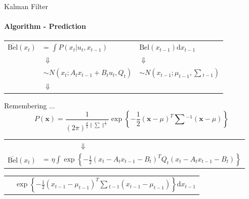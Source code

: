 \documentclass[aspectratio=169]{beamer}
\begin{document}
\begin{frame}[c]{Kalman Filter}
    \framesubtitle{Algorithm - Prediction}
    \begin{tabular}{p{1.5cm} l l}
        $\overline{\text{Bel}}(x_t)$  & = $\displaystyle\int P(x_t|u_t, x_{t-1})$ & $\text{Bel}(x_{t-1})\text{d}x_{t-1}$ \\
        & \quad\quad\quad\quad\quad $\Downarrow$ & \quad\quad\quad$\Downarrow$ \\
        & $\sim N\left(x_t; A_t x_{t-1}+ B_tu_t, Q_t\right)$ & $\sim N\left(x_{t-1}; \mu_{t-1}, \textstyle\sum {}_{t-1}\right)$ \\
        & \quad\quad\quad\quad\quad $\Downarrow$ & \\
    \end{tabular}
    \begin{block}{Remembering ...}
        \begin{equation*}
            P(\mathbf{x}) = \frac{1}{(2\pi)^{\frac{d}{2}\|\sum\|^{\frac{1}{2}}}}\exp\left\{-\frac{1}{2} (\mathbf{x}-\mu)^T\textstyle\sum{}^{-1}(\mathbf{x}-\mu)\right\}
        \end{equation*}        
    \end{block}
    \begin{tabular}{p{1.2cm} l}
        & $\quad\quad\quad\quad\quad \Downarrow$\\
        $\overline{\text{Bel}}(x_t)$  & = $\eta \displaystyle\int \exp\left\{  -\frac{1}{2} \left(x_t - A_t x_{t-1} - B_t\right)^T Q_t \left(x_t - A_t x_{t-1} - B_t\right)  \right\}$ \\
    \end{tabular}
    \begin{tabular}{p{2.3cm} l}
        & $\exp\left\{ -\displaystyle\frac{1}{2} \left(x_{t-1} - \mu_{t-1}\right)^T \textstyle\sum {}_{t-1} \left(x_{t-1} - \mu_{t-1}\right)  \right\}\text{d}x_{t-1}$
    \end{tabular}    

\end{frame}
\end{document}
